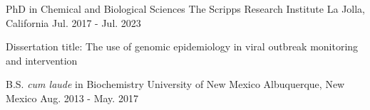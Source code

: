 
\begin{cventries}

  \cventry
    {PhD in Chemical and Biological Sciences} %
    {The Scripps Research Institute} %
    {La Jolla, California} %
    {Jul. 2017 - Jul. 2023} %
    {
      \begin{cvitems} %
        \item{Dissertation title: The use of genomic epidemiology in viral outbreak monitoring and intervention}
      \end{cvitems}
    }

  \cventry
    {B.S. \textit{cum laude} in Biochemistry} %
    {University of New Mexico} %
    {Albuquerque, New Mexico} %
    {Aug. 2013 - May. 2017} %
    {}

\end{cventries}
